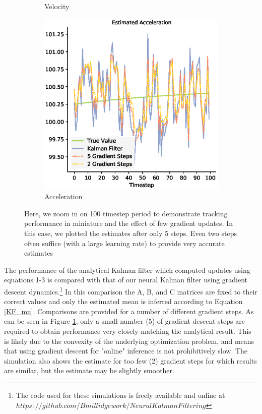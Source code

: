 \begin{figure}
\begin{subfigure}{0.49\textwidth}
 \caption{Velocity}
 \end{subfigure}
 \begin{subfigure}{0.49\textwidth}
 \centering
 \includegraphics[width=.95\linewidth]{chapter_3_figures/Estimated_Acceleration_NKF_zoomed.eps}
 \caption{Acceleration}
 \end{subfigure}
 \caption{Here, we zoom in on 100 timestep period to demonstrate tracking performance in miniature and the effect of few gradient updates. In this case, we plotted the estimates after only 5 steps. Even two steps often suffice (with a large learning rate) to provide very accurate estimates}
 
\label{KF_tracking}
\end{figure}


The performance of the analytical Kalman filter which computed updates using equations 1-3 is compared with that of our neural Kalman filter using gradient descent dynamics.\footnote{The code used for these simulations is freely available and online at $https://github.com/Bmillidgework/NeuralKalmanFiltering$} In this comparison the A, B, and C matrices are fixed to their correct values and only the estimated mean is inferred according to Equation \ref{KF_mu}. Comparisons are provided for a number of different gradient steps. As can be seen in Figure \ref{KF_tracking}, only a small number (5) of gradient descent steps are required to obtain performance very closely matching the analytical result. This is likely due to the convexity of the underlying optimization problem, and means that using gradient descent for "online" inference is not prohibitively slow. The simulation also shows the estimate for too few (2) gradient steps for which results are similar, but the estimate may be slightly smoother.

